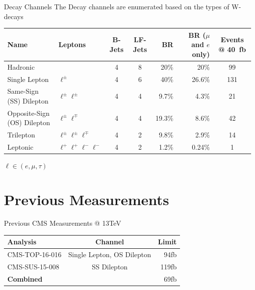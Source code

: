 \documentclass[english,aspectratio=169]{beamer}
\newcommand{\fb}{\si{\femto\barn}}%
\newcommand{\invfb}{\si{\per\femto\barn}}
\begin{document}
\begin{frame}{Decay Channels}
  The Decay channels are enumerated based on the types of W-decays
\begin{table}[]
  \tiny
  \begin{tabular}{@{}llccrrc@{}}
    \textbf{Name}               & \textbf{Leptons}           & \textbf{B-Jets} & \textbf{LF-Jets} & \textbf{BR}     & \textbf{BR ($\mu$ and $e$ only)} & \textbf{Events @ 40\invfb}    \\ \midrule
  Hadronic                    &                            & 4               & 8                & 20\%            & 20\%                             & 99                               \\ \midrule
  Single Lepton               & $\ell^\pm$                 & 4               & 6                & 40\%            & 26.6\%                           & 131                              \\ \midrule
  Same-Sign (SS) Dilepton     & $\ell^\pm \ell^\pm$        & 4               & 4                & 9.7\%           & 4.3\%                            & 21                               \\ \midrule
  Opposite-Sign (OS) Dilepton & $\ell^\pm \ell^\mp$        & 4               & 4                & 19.3\%          & 8.6\%                            & 42                               \\ \midrule
  Trilepton                   & $\ell^\pm\ell^\pm\ell^\mp$ & 4               & 2                & 9.8\%           & 2.9\%                            & 14                               \\ \midrule
  Leptonic                    & $\ell^+\ell^+\ell^-\ell^-$ & 4               & 2                & 1.2\%           & 0.24\%                           & 1                                \\ \bottomrule
  \end{tabular}
\end{table}
\vfill
\footnotesize{$\ell \in \left(e,\mu,\tau\right)$}
\end{frame}

\section{Previous Measurements}
\begin{frame}{Previous CMS Measurements @ 13TeV}
\begin{table}[]
  \begin{tabular}{@{}lcr@{}}
  \textbf{Analysis}           & \textbf{Channel}            & \textbf{Limit}  \\ \midrule
  CMS-TOP-16-016              & Single Lepton, OS Dilepton  & 94\fb          \\ \midrule%
  CMS-SUS-15-008              & SS Dilepton                 & 119\fb         \\ \bottomrule%
  \textbf{Combined}           &                             & 69\fb          \\%
  \end{tabular}
\end{table}
\end{frame}
\end{document}
